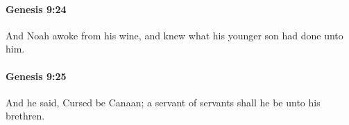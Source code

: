 		\paragraph{Genesis 9:24} %
			\label{GENESIS-9-24}

			And Noah awoke from his wine, and knew what his younger son had done unto him.


		\paragraph{Genesis 9:25} %
			\label{GENESIS-9-25}

			And he said, Cursed be Canaan; a servant of servants shall he be unto his brethren.


